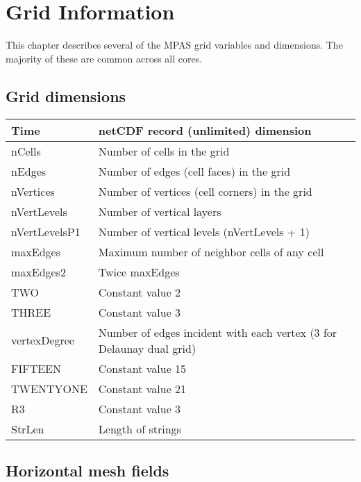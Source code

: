 \chapter{Grid Information}
\label{chap:grid_information}

This chapter describes several of the MPAS grid variables and dimensions. The majority of these are common across all cores.

\section{Grid dimensions}

{\small
\begin{longtable}{|p{1.75in} |p{4.5in}|}
 \hline
        Time     &   netCDF record (unlimited) dimension \\ \hline
        nCells       &   Number of cells in the grid \\ \hline
        nEdges      &   Number of edges (cell faces) in the grid \\ \hline
        nVertices    &   Number of vertices (cell corners) in the grid \\ \hline
        nVertLevels     &   Number of vertical layers \\ \hline
        nVertLevelsP1   &   Number of vertical levels (nVertLevels + 1) \\ \hline
        maxEdges        &   Maximum number of neighbor cells of any cell \\ \hline
        maxEdges2       &   Twice maxEdges \\ \hline
        TWO              &   Constant value 2 \\ \hline
        THREE            &   Constant value 3 \\ \hline
        vertexDegree     &   Number of edges incident with each vertex (3 for Delaunay dual grid) \\ \hline
        FIFTEEN         &   Constant value 15 \\ \hline
        TWENTYONE       &   Constant value 21 \\ \hline
        R3               &   Constant value 3 \\ \hline
        StrLen          &   Length of strings \\ \hline
\end{longtable}
}

\section{Horizontal mesh fields}
\label{sec:mesh_fields}

